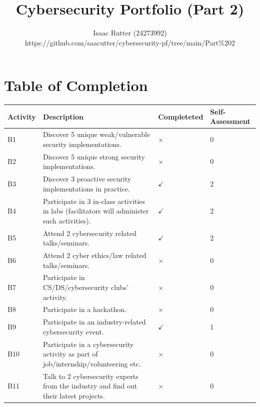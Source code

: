 \documentclass[titlepage]{article}
\title{\textbf{Cybersecurity Portfolio (Part 2)}}
\author{Isaac Rutter (24273992) \\ https://github.com/saacutter/cybersecurity-pf/tree/main/Part\%202}
\date{}
\begin{document}
    \maketitle

    \newpage

    \section*{\centering Table of Completion}

    \bigskip

    \begin{center}
        \begin{tabular}{ |p{4em}|p{30em}|C{6em}|C{5em}| }
            \hline
            Activity & Description & Completeted & Self-Assessment \\
            \hline
            B1 & Discover 5 unique weak/vulnerable security implementations. & $\times$ & 0 \\
            \hline
            B2 & Discover 5 unique strong security implementations. & $\times$ & 0 \\
            \hline
            B3 & Discover 3 proactive security implementations in practice. & $\checkmark$ & 2 \\
            \hline
            B4 & Participate in 3 in-class activities in labs (facilitators will administer such activities). & $\checkmark$ & 2 \\
            \hline
            B5 & Attend 2 cybersecurity related talks/seminars. & $\checkmark$ & 2 \\
            \hline
            B6 & Attend 2 cyber ethics/law related talks/seminars. & $\times$ & 0 \\
            \hline
            B7 & Participate in CS/DS/cybersecurity clubs’ activity. & $\times$ & 0 \\
            \hline
            B8 & Participate in a hackathon. & $\times$ & 0 \\
            \hline
            B9 & Participate in an industry-related cybersecurity event. & $\checkmark$ & 1 \\
            \hline
            B10 & Participate in a cybersecurity activity as part of job/internship/volunteering etc. & $\times$ & 0 \\
            \hline
            B11 & Talk to 2 cybersecurity experts from the industry and find out their latest projects. & $\times$ & 0 \\

\end{tabular}
\end{center}
\end{document}
